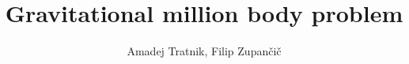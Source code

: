\documentclass[A4]{article}
\begin{document}
\title{Gravitational million body problem}
\author{Amadej Tratnik, Filip Zupančič}
\maketitle


\end{document}
